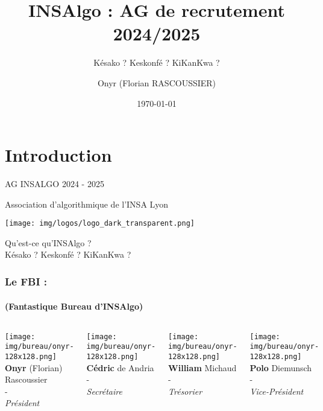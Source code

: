 \documentclass[compress,12pt,bookmark]{beamer}
\title{INSAlgo : AG de recrutement 2024/2025}
\subtitle{Késako ? Keskonfé ? KiKanKwa ?}
\date{\today}
\author{Onyr (Florian RASCOUSSIER)} %
\begin{document}

\section{Introduction}

\begin{frame}
    \centering
    \Huge
    AG INSALGO 2024 - 2025

    \large
    Association d'algorithmique de l'INSA Lyon

    \texttt{[image: img/logos/logo\_dark\_transparent.png]}

    \normalsize
    Qu'est-ce qu'INSAlgo ? \\
    Késako ? Keskonfé ? KiKanKwa ?
    \vfill
\end{frame}

\begin{frame}
    \frametitle{Le FBI :}
    \framesubtitle{(Fantastique Bureau d'INSAlgo)}

    \begin{columns}
        \begin{minipage}{\textwidth}
            \texttt{[image: img/bureau/onyr-128x128.png]}
            \centering \textbf{Onyr} (Florian) Rascoussier \\
            - \\
            \textit{Président}
        \end{minipage}

        \begin{minipage}{\textwidth}
            \texttt{[image: img/bureau/onyr-128x128.png]}
            \centering \textbf{Cédric} de Andria \\
            - \\
            \textit{Secrétaire}
        \end{minipage}

        \begin{minipage}{\textwidth}
            \texttt{[image: img/bureau/onyr-128x128.png]}
            \centering \textbf{William} Michaud \\
            - \\
            \textit{Trésorier}
        \end{minipage}

        \begin{minipage}{\textwidth}
            \texttt{[image: img/bureau/onyr-128x128.png]}
            \centering \textbf{Polo} Diemunsch \\
            - \\
            \textit{Vice-Président}
        \end{minipage}
    \end{columns}
\end{frame}
\end{document}
